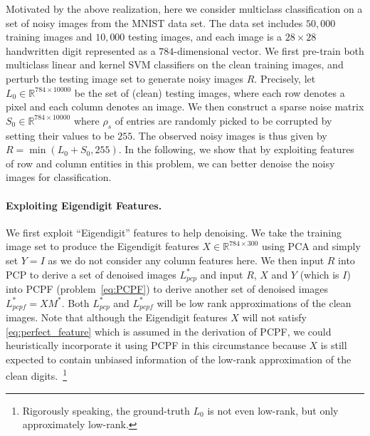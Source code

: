 \documentclass[twoside,11pt]{article}
\def\R{\mathbb{R}}
\def\realL{L_0}
\def\realS{S_0}
\def\optL{L^*}
\def\optM{M^*}
\begin{document}
Motivated by the above realization, here we consider multiclass classification
on a set of noisy images from the MNIST data set.  The data set includes
$50,000$ training images and $10,000$ testing images, and each image is a $28\times28$
handwritten digit
represented as a $784$-dimensional vector.
We first pre-train both multiclass linear and kernel
SVM classifiers on the clean training images, %
and perturb the testing image set to generate noisy images $R$.
Precisely, let $\realL \in \R^{784 \times 10000}$ be the set of (clean) testing images, where
each row denotes a pixel and each column denotes an image.  We then construct a sparse noise matrix
$\realS \in \R^{784 \times 10000}$ where $\rho_s$ of entries are randomly picked to be corrupted
by setting their values to be $255$.  The observed noisy images is thus given by
$R = \min(\realL + \realS, 255)$.  In the following, we show that by exploiting features of row and
column entities in this problem, we can better denoise the noisy images for classification.

\paragraph{Exploiting Eigendigit Features.}
We first exploit ``Eigendigit'' features to help denoising.  We take the training image set
to produce the Eigendigit features $X \in \R^{784 \times 300}$ using PCA and simply set
$Y = I$ as we do not consider any column features here.
We then input $R$ into PCP to derive a set of denoised images $\optL_{pcp}$ and
input $R$, $X$ and $Y$ (which is $I$) into PCPF (problem~\ref{eq:PCPF}) to derive another
set of denoised images $\optL_{pcpf} = X\optM$.
Both $\optL_{pcp}$ and $\optL_{pcpf}$ will be low rank approximations
of the clean images.
Note that although the Eigendigit features $X$ will not satisfy \eqref{eq:perfect_feature}
which is assumed in the derivation of PCPF,
we could heuristically incorporate it using PCPF in this circumstance because $X$ is still expected to
contain unbiased information of the low-rank approximation
of the clean digits.~\footnote{Rigorously speaking, the ground-truth $\realL$
is not even low-rank, but only approximately low-rank.}
\end{document}

